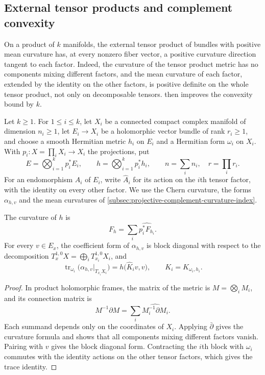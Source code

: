 \subsection{External tensor products and complement convexity}
\label{subsec:external-tensor-complement-curvature}

On a product of $k$ manifolds, the external tensor product of bundles with positive mean curvature has, at every nonzero fiber vector, a positive curvature direction tangent to each factor. Indeed, the curvature of the tensor product metric has no components mixing different factors, and the mean curvature of each factor, extended by the identity on the other factors, is positive definite on the whole tensor product, not only on decomposable tensors.  then improves the convexity bound by $k$.

Let $k\geq1$. For $1\leq i\leq k$, let $X_i$ be a connected compact complex manifold of dimension $n_i\geq1$, let $E_i\to X_i$ be a holomorphic vector bundle of rank $r_i\geq1$, and choose a smooth Hermitian metric $h_i$ on $E_i$ and a Hermitian form $\omega_i$ on $X_i$. With $p_i\colon X=\prod_iX_i\to X_i$ the projections, put
\[
 E=\bigotimes_{i=1}^kp_i^*E_i,\qquad h=\bigotimes_{i=1}^kp_i^*h_i,
 \qquad n=\sum_i n_i,\quad r=\prod_i r_i.
\]
For an endomorphism $A_i$ of $E_i$, write $\widehat A_i$ for its action on the $i$th tensor factor, with the identity on every other factor. We use the Chern curvature, the forms $\alpha_{h,v}$ and the mean curvatures of \cref{subsec:projective-complement-curvature-index}.

\begin{lemma}\label{lem:external-tensor-curvature-traces}
The curvature of $h$ is
\[
 F_h=\sum_i\widehat{p_i^*F_{h_i}}.
\]
For every $v\in E_x$, the coefficient form of $\alpha_{h,v}$ is block diagonal with respect to the decomposition $T_x^{1,0}X=\bigoplus_iT_{x_i}^{1,0}X_i$, and
\[
 \operatorname{tr}_{\omega_i}\bigl(\alpha_{h,v}|_{T_{x_i}X_i}\bigr)
 =h\bigl(\widehat K_i v,v\bigr),\qquad K_i=K_{\omega_i,h_i}.
\]
\end{lemma}
\begin{proof}
In product holomorphic frames, the matrix of the metric is $M=\bigotimes_iM_i$, and its connection matrix is
\[
 M^{-1}\partial M=\sum_i\widehat{M_i^{-1}\partial M_i}.
\]
Each summand depends only on the coordinates of $X_i$. Applying $\bar\partial$ gives the curvature formula and shows that all components mixing different factors vanish. Pairing with $v$ gives the block diagonal form. Contracting the $i$th block with $\omega_i$ commutes with the identity actions on the other tensor factors, which gives the trace identity.
\end{proof}

